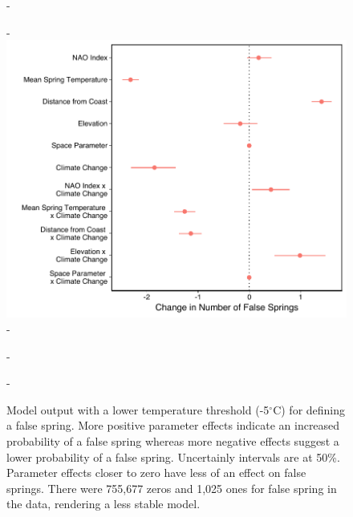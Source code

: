 \documentclass{article}\usepackage[]{graphicx}\usepackage[]{color}
\begin{document}
{\begin{figure} [H]
  -\begin{center}
  -\includegraphics[width=12cm]{..//figures/model_output_berniefive_50.pdf}
  -\caption{Model output with a lower temperature threshold (-5$^{\circ}$C) for defining a false spring. More positive parameter effects indicate an increased probability of a false spring whereas more negative effects suggest a lower probability of a false spring. Uncertainly intervals are at 50\%. Parameter effects closer to zero have less of an effect on false springs. There were 755,677 zeros and 1,025 ones for false spring in the data, rendering a less stable model.}\label{fig:five}
  -\end{center}
  -\end{figure}}
  

\end{document}
